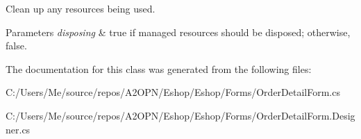 Clean up any resources being used. 


\begin{DoxyParams}{Parameters}
{\em disposing} & true if managed resources should be disposed; otherwise, false.\\
\hline
\end{DoxyParams}


The documentation for this class was generated from the following files\+:\begin{DoxyCompactItemize}
\item 
C\+:/\+Users/\+Me/source/repos/\+A2\+O\+P\+N/\+Eshop/\+Eshop/\+Forms/Order\+Detail\+Form.\+cs\item 
C\+:/\+Users/\+Me/source/repos/\+A2\+O\+P\+N/\+Eshop/\+Eshop/\+Forms/Order\+Detail\+Form.\+Designer.\+cs\end{DoxyCompactItemize}
